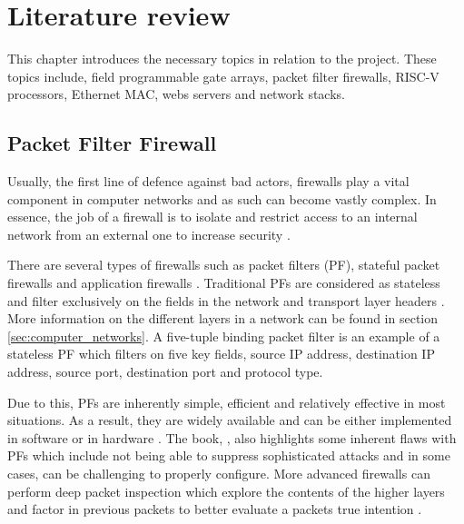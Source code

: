 \chapter[Literature review]{Literature review }
\label{Chap:label}	%
\pagestyle{headings}

This chapter introduces the necessary topics in relation to the project. These topics include, field programmable gate arrays, packet filter firewalls, RISC-V processors, Ethernet MAC, webs servers and network stacks.  








\section{Packet Filter Firewall}

Usually, the first line of defence against bad actors, firewalls play a vital component in computer networks and as such can become vastly complex. 
In essence, the job of a firewall is to isolate and restrict access to an internal network from an external one to increase security \cite{BuildingInternetFirewalls}.

There are several types of firewalls such as packet filters (PF), stateful packet firewalls and application firewalls \cite{FirewallsBook}. 
Traditional PFs are considered as stateless and filter exclusively on the fields in the network and transport layer headers \cite{FirewallsBook}.  More information on the different layers in a network can be found in section \ref{sec:computer_networks}. A five-tuple binding packet filter is an example of a stateless PF which filters on five key fields, source IP address, destination IP address, source port, destination port and protocol type.

Due to this, PFs are inherently simple, efficient and relatively effective in most situations. As a result, they are widely available and can be either implemented in software or in hardware \cite{BuildingInternetFirewalls}. The book, \cite{BuildingInternetFirewalls}, also highlights some inherent flaws with PFs which include not being able to suppress sophisticated attacks and in some cases, can be challenging to properly configure. More advanced firewalls can perform deep packet inspection which explore the contents of the higher layers and factor in previous packets to better evaluate a packets true intention \cite{FirewallsBook}. 

